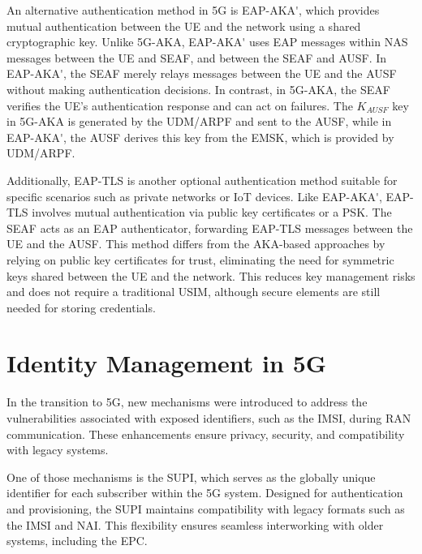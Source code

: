 

An alternative authentication method in \ac{5G} is \ac{EAP-AKA'}, which provides mutual authentication between the \ac{UE} and the network using a shared cryptographic key. Unlike \ac{5G-AKA}, \ac{EAP-AKA'} uses \ac{EAP} messages within \ac{NAS} messages between the \ac{UE} and \ac{SEAF}, and between the \ac{SEAF} and \ac{AUSF}. In \ac{EAP-AKA'}, the \ac{SEAF} merely relays messages between the \ac{UE} and the \ac{AUSF} without making authentication decisions. In contrast, in \ac{5G-AKA}, the \ac{SEAF} verifies the \ac{UE}'s authentication response and can act on failures. The $K_{AUSF}$ key in \ac{5G-AKA} is generated by the \ac{UDM}/\ac{ARPF} and sent to the \ac{AUSF}, while in \ac{EAP-AKA'}, the \ac{AUSF} derives this key from the \ac{EMSK}, which is provided by \ac{UDM}/\ac{ARPF}.


Additionally, \ac{EAP-TLS} is another optional authentication method suitable for specific scenarios such as private networks or \ac{IoT} devices. Like \ac{EAP-AKA'}, \ac{EAP-TLS} involves mutual authentication via public key certificates or a \ac{PSK}. The \ac{SEAF} acts as an \ac{EAP} authenticator, forwarding \ac{EAP-TLS} messages between the \ac{UE} and the \ac{AUSF}. This method differs from the \ac{AKA}-based approaches by relying on public key certificates for trust, eliminating the need for symmetric keys shared between the \ac{UE} and the network. This reduces key management risks and does not require a traditional \ac{USIM}, although secure elements are still needed for storing credentials.

\section{Identity Management in \acs{5G}} %

In the transition to \ac{5G}, new mechanisms were introduced to address the vulnerabilities associated with exposed identifiers, such as the \ac{IMSI}, during \ac{RAN} communication. These enhancements ensure privacy, security, and compatibility with legacy systems.

One of those mechanisms is the \ac{SUPI}, which serves as the globally unique identifier for each subscriber within the \ac{5G} system. Designed for authentication and provisioning, the \ac{SUPI} maintains compatibility with legacy formats such as the \ac{IMSI} and \ac{NAI}. This flexibility ensures seamless interworking with older systems, including the \ac{EPC}.


